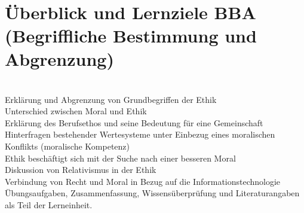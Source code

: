 \documentclass[journal]{IEEEtran}
\begin{document}
\begin{onecolumn}
\\
\\
\\
\\
\\
\\
\\
\\
\\
\\
\\

\section{Überblick und Lernziele BBA (Begriffliche Bestimmung und Abgrenzung)}
\\

Erklärung und Abgrenzung von Grundbegriffen der Ethik
\\
Unterschied zwischen Moral und Ethik
\\
Erklärung des Berufsethos und seine Bedeutung für eine Gemeinschaft
\\
Hinterfragen bestehender Wertesysteme unter Einbezug eines moralischen Konflikts (moralische Kompetenz)
\\
Ethik beschäftigt sich mit der Suche nach einer besseren Moral
\\
Diskussion von Relativismus in der Ethik
\\
Verbindung von Recht und Moral in Bezug auf die Informationstechnologie
\\
Übungsaufgaben, Zusammenfassung, Wissensüberprüfung und Literaturangaben als Teil der Lerneinheit.


\end{onecolumn}
\end{document}
